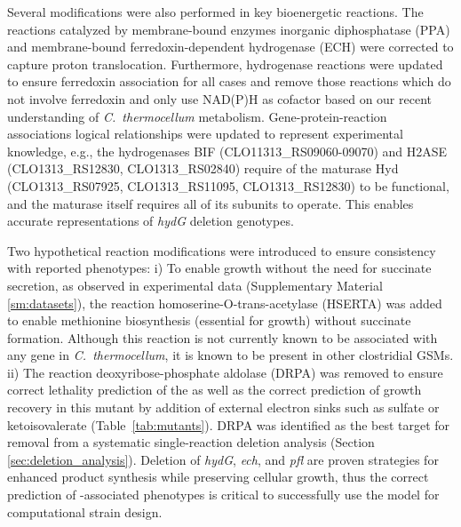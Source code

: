 Several modifications were also performed in key bioenergetic reactions.
The reactions catalyzed by membrane-bound enzymes inorganic diphosphatase (PPA) \citep{zhou2013} and
membrane-bound ferredoxin-dependent hydrogenase (ECH)\citep{calusinska2010}
were corrected to capture proton translocation.
Furthermore, hydrogenase reactions were updated to ensure ferredoxin association for all cases and remove those reactions which do not involve ferredoxin and only use NAD(P)H as cofactor based on our recent understanding of \textit{C.~thermocellum} metabolism.\citep{biswas2017} %
Gene-protein-reaction associations logical relationships were updated to
represent experimental knowledge, e.g., the hydrogenases BIF (CLO11313\_RS09060-09070) and H2ASE (CLO1313\_RS12830, CLO1313\_RS02840) require of the maturase Hyd (CLO1313\_RS07925, CLO1313\_RS11095, CLO1313\_RS12830) to be functional, and the maturase itself requires all of its subunits to operate. This enables accurate representations of \textit{hydG} deletion genotypes.\citep{biswas2015}

Two hypothetical reaction modifications were introduced to ensure consistency with reported phenotypes:
i) To enable growth without the need for succinate secretion, as observed in experimental data (Supplementary Material \ref{sm:datasets}), the reaction homoserine-O-trans-acetylase (HSERTA) was added to enable methionine biosynthesis (essential for growth) without succinate formation.
Although this reaction is not currently known to be associated with any gene in \textit{C.~thermocellum}, it is known to be present in other clostridial GSMs. \citep{nagarajan2013}
ii) The reaction deoxyribose-phosphate aldolase (DRPA) was removed to ensure correct lethality prediction of the  as well as the correct prediction of growth recovery in this mutant by addition of external electron sinks such as sulfate or ketoisovalerate (Table~\ref{tab:mutants}). DRPA  was identified as the best target for removal from a systematic single-reaction deletion analysis (Section \ref{sec:deletion_analysis}).
Deletion of \textit{hydG}, \textit{ech}, and \textit{pfl}  are proven strategies for enhanced product synthesis while preserving cellular growth, \citep{biswas2015, thompson2015, tian2016}
thus the correct prediction of -associated phenotypes is critical to successfully use the model for computational strain design.\citep{long2015, ng2015, maranas2016, wang2018,garcia2019, garcia2019b, garcia2019c}

